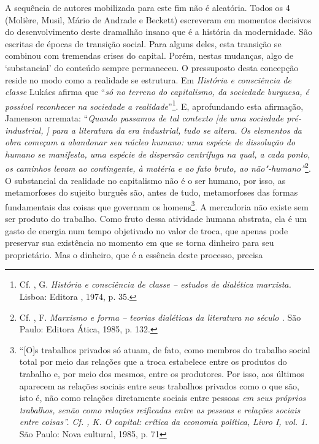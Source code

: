 A sequência de autores mobilizada para este fim não é aleatória. Todos
os 4 (Molière, Musil, Mário de Andrade e Beckett) escreveram em momentos
decisivos do desenvolvimento deste dramalhão insano que é a história da
modernidade. São escritas de épocas de transição social. Para alguns
deles, esta transição se combinou com tremendas crises do capital.
Porém, nestas mudanças, algo de `substancial' do conteúdo sempre
permaneceu. O pressuposto desta concepção reside no modo como a
realidade se estrutura. Em \emph{História e consciência de classe}
Lukács afirma que ``\emph{só no terreno do capitalismo, da sociedade
burguesa, é possível reconhecer na sociedade a realidade}''\footnote{Cf.
  , G. \emph{\emph{História e consciência de classe -- estudos
  de dialética marxista}.} Lisboa: Editora , 1974, p. 35.}. E,
aprofundando esta afirmação, Jamenson arremata: ``\emph{Quando passamos
de tal contexto [de uma sociedade pré-industrial, ] para a
literatura da era industrial, tudo se altera. Os elementos da obra
começam a abandonar seu núcleo humano: uma espécie de dissolução do
humano se manifesta, uma espécie de dispersão centrífuga na qual, a cada
ponto, os caminhos levam ao contingente, à matéria e ao fato bruto, ao
não"-humano''}\footnote{Cf. , F. \emph{\emph{Marxismo e forma --
  teorias dialéticas da literatura no século }.} São Paulo: Editora
  Ática, 1985, p. 132.}. O substancial da realidade no capitalismo não é
o ser humano, por isso, as metamorfoses do sujeito burguês são, antes de
tudo, metamorfoses das formas fundamentais das coisas que governam os
homens\footnote{``[O]s trabalhos privados só atuam, de fato, como
  membros do trabalho social total por meio das relações que a troca
  estabelece entre os produtos do trabalho e, por meio dos mesmos, entre
  os produtores. Por isso, aos últimos aparecem as relações sociais
  entre seus trabalhos privados como o que são, isto é, não como
  relações diretamente sociais entre pessoas \emph{em seus próprios
  trabalhos, senão como relações reificadas entre as pessoas e relações
  sociais entre coisas''. Cf. , K. \emph{O capital: crítica da
  economia política, }}\emph{Livro I, vol. 1}. São Paulo: Nova
  cultural, 1985, p. 71}. A mercadoria não existe sem ser produto do
trabalho. Como fruto dessa atividade humana abstrata, ela é um gasto de
energia num tempo objetivado no valor de troca, que apenas pode
preservar sua existência no momento em que se torna dinheiro para seu
proprietário. Mas o dinheiro, que é a essência deste processo, precisa
